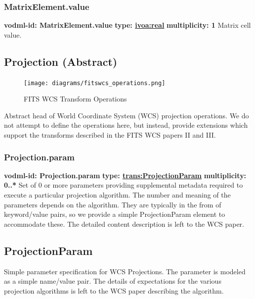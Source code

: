     \subsubsection{MatrixElement.value}
      \textbf{vodml-id: MatrixElement.value} \newline
      \textbf{type: \hyperref[sect:ivoa]{ivoa:real}} \newline
      \textbf{multiplicity: 1} \newline 
      Matrix cell value.

  \subsection{Projection (Abstract)}
  \label{sect:Projection}

    \begin{figure}[h]
    \begin{center}
      \texttt{[image: diagrams/fitswcs\_operations.png]}
      \caption{FITS WCS Transform Operations}\label{fig:WCSOps}
    \end{center}
    \end{figure}

    Abstract head of World Coordinate System (WCS) projection operations. We do not attempt to define the operations here, but instead, provide extensions which support the transforms described in the FITS WCS papers II and III.

    \subsubsection{Projection.param}
      \textbf{vodml-id: Projection.param} \newline
      \textbf{type: \hyperref[sect:ProjectionParam]{trans:ProjectionParam}} \newline
      \textbf{multiplicity: 0..*} \newline 
      Set of 0 or more parameters providing supplemental metadata required to execute a particular projection algorithm. The number and meaning of the parameters depends on the algorithm. They are typically in the from of keyword/value pairs, so we provide a simple ProjectionParam element to accommodate these. The detailed content description is left to the WCS paper.

  \subsection{ProjectionParam}
  \label{sect:ProjectionParam}
    Simple parameter specification for WCS Projections. The parameter is modeled as a simple name/value pair. The details of expectations for the various projection algorithms is left to the WCS paper describing the algorithm.

